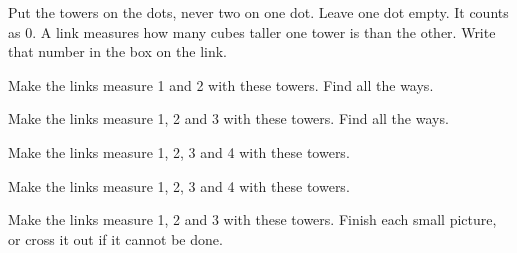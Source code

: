 \documentclass[12pt]{article}
\begin{document}
\large
\setlength{\baselineskip}{20pt}

Put the towers on the dots, never two on one dot. Leave one dot empty. It counts as 0. A link measures how many cubes taller one tower is than the other. Write that number in the box on the link.

\medskip
\begin{center}
\end{center}

\vspace{0.9cm}
 Make the links measure 1 and 2 with these towers. Find all the ways.

\vspace{0.6cm}
\hspace{2.2cm}

\vspace{1.0cm}
\begin{center}
\end{center}

\newpage
{} Make the links measure 1, 2 and 3 with these towers. Find all the ways.

\vspace{0.5cm}
\begin{center}

\vspace{0.9cm}

\vspace{1.3cm}
\end{center}

\newpage
{} Make the links measure 1, 2, 3 and 4 with these towers.

\vspace{0.5cm}

\vspace{0.5cm}
\begin{center}
\end{center}

\vspace{1.4cm}
 Make the links measure 1, 2, 3 and 4 with these towers.

\vspace{0.6cm}
\begin{center}
\end{center}

\newpage
{} Make the links measure 1, 2 and 3 with these towers. Finish each small picture, or cross it out if it cannot be done.
\end{document}
